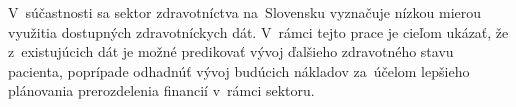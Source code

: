 
V súčastnosti sa sektor zdravotníctva na Slovensku vyznačuje nízkou mierou využitia dostupných zdravotníckych dát.  V rámci tejto prace je cieľom ukázať, že z existujúcich dát je možné predikovať vývoj ďalšieho zdravotného stavu pacienta, poprípade odhadnúť vývoj budúcich nákladov za účelom lepšieho plánovania prerozdelenia financií v rámci sektoru. 